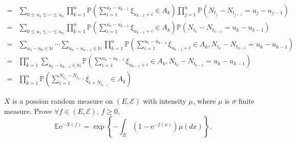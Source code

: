 \documentclass{ctexart}
\begin{document}
\begin{solution}
\begin{enumerate}
\begin{equation}
\begin{aligned}
          = & \sum_{0 \leq u_1\leq \cdots\leq u_n}\prod_{k=1}^{n} \mathbb{P}(\sum_{i= 1}^{u_k-u_{k-1}}\xi_{u_{k-1}+ i}  \in A_k)\prod_{j=1}^{n} \mathbb{P}(N_{t_{j}}-N_{t_{j-1}}=u_j-u_{j-1})         \\
          = & \sum_{0 \leq u_1\leq \cdots\leq u_n}\prod_{k=1}^{n} \mathbb{P}(\sum_{i= 1}^{u_k-u_{k-1}}\xi_{u_{k-1}+ i}  \in A_k)\mathbb{P}(N_{t_{k}}-N_{t_{k-1}}=u_k-u_{k-1})                         \\
          = & \sum_{u_1-u_{0} \in \mathbb{N}}\cdots \sum_{u_n-u_{n-1} \in \mathbb{N}}\prod_{k=1}^{n} \mathbb{P}(\sum_{i= 1}^{u_k-u_{k-1}}\xi_{u_{k-1}+ i}  \in A_k,N_{t_{k}}-N_{t_{k-1}}=u_k-u_{k-1}) \\
          = & \prod_{k=1}^{n} \sum_{u_k-u_{k-1} \in \mathbb{N}}\mathbb{P}(\sum_{i= 1}^{u_k-u_{k-1}}\xi_{u_{k-1}+ i}  \in A_k,N_{t_{k}}-N_{t_{k-1}}=u_k-u_{k-1})                                       \\
          = & \prod_{k=1}^n\mathbb{P}(\sum_{i=1}^{N_{t_k}-N_{t_{k-1}}}\xi_{i + N_{t_{k-1}}}  \in A_k)
        \end{aligned}
      \end{equation}
  \end{enumerate}

\end{solution}
\begin{problem}\label{pro:2}
  \(X\) is a possion random measure on \((E,\mathscr{E})\) with intensity \(\mu\), where \(\mu\) is \(\sigma\) finite measure.
  Prove \(\forall f \in (E,\mathscr{E})\), \(f \geq 0\), \[
    \mathbb{E}\mathrm{e}^{-X(f)}=\mathrm{\exp}\left\{-\int_{E}(1-\mathrm{e}^{-f(x)})\mu(dx)\right\}.
  \]
\end{problem}
\end{document}
